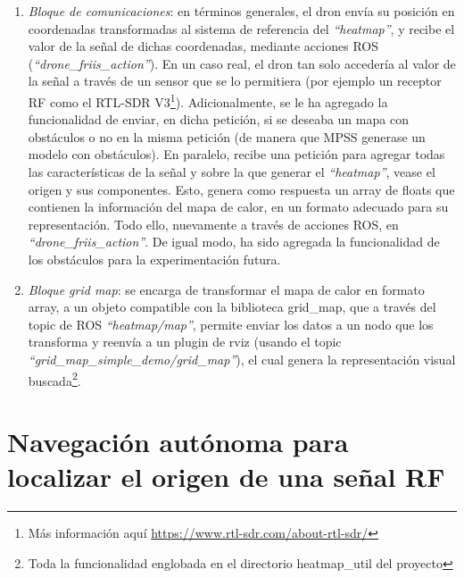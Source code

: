 \begin{enumerate}
	\item \emph{Bloque de comunicaciones}: en términos generales, el dron envía su posición en coordenadas transformadas al sistema de referencia del \emph{``heatmap''}, y recibe el valor de la señal de dichas coordenadas, mediante acciones \ac{ROS} (\emph{``drone\_friis\_action''}). En un caso real, el dron tan solo accedería al valor de la señal a través de un sensor que se lo permitiera (por ejemplo un receptor \ac{RF} como el RTL-SDR V3\footnote[4]{Más información aquí \url{https://www.rtl-sdr.com/about-rtl-sdr/}}). Adicionalmente, se le ha agregado la funcionalidad de enviar, en dicha petición, si se deseaba un mapa con obstáculos o no en la misma petición (de manera que \ac{MPSS} generase un modelo con obstáculos). En paralelo, recibe una petición para agregar todas las características de la señal y sobre la que generar el \emph{``heatmap''}, vease el origen y sus componentes. Esto, genera como respuesta un array de floats que contienen la información del mapa de calor, en un formato adecuado para su representación. Todo ello, nuevamente a través de acciones \ac{ROS}, en \emph{``drone\_friis\_action''}. De igual modo, ha sido agregada la funcionalidad de los obstáculos para la experimentación futura.
	\item \emph{Bloque grid map}: se encarga de transformar el mapa de calor en formato array, a un objeto compatible con la biblioteca grid\_map, que a través del topic de \ac{ROS} \emph{``heatmap/map''}, permite enviar los datos a un nodo que los transforma y reenvía a un plugin de rviz (usando el topic \emph{``grid\_map\_simple\_demo/grid\_map''}), el cual genera la representación visual buscada\footnote[5]{Toda la funcionalidad englobada en el directorio heatmap\_util del proyecto}.
\end{enumerate}

\section{Navegación autónoma para localizar el origen de una señal \ac{RF}}
\label{sec:signal_follow}

